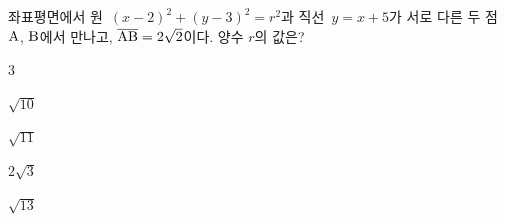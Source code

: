 좌표평면에서 원~$(x-2)^2+(y-3)^2=r^2$과 직선~$y=x+5$가 서로 다른 두 점~$\mathrm{A}$, $\mathrm{B}$에서 만나고, $\overline{\mathrm{AB}}=2\sqrt{2}$이다. 양수 $r$의 값은?
\begin{choices32}{\rule[-3ex]{0pt}{8ex}$3$}{\rule[-3ex]{0pt}{8ex}$\sqrt{10}$}{\rule[-3ex]{0pt}{8ex}$\sqrt{11}$}{\rule[-3ex]{0pt}{8ex}$2\sqrt{3}$}{\rule[-3ex]{0pt}{8ex}$\sqrt{13}$}\end{choices32}
